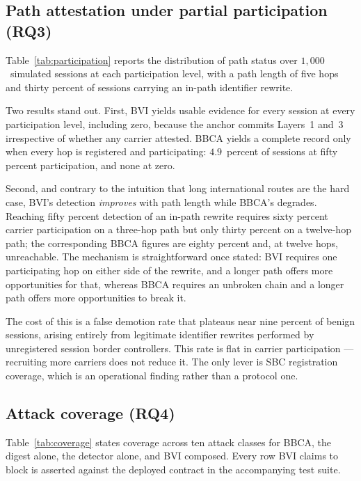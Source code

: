 \subsection{Path attestation under partial participation (RQ3)}

Table~\ref{tab:participation} reports the distribution of path status over
$1{,}000$~simulated sessions at each participation level, with a path length of
five hops and thirty percent of sessions carrying an in-path identifier
rewrite.

Two results stand out. First, BVI yields usable evidence for every session at
every participation level, including zero, because the anchor commits Layers~1
and~3 irrespective of whether any carrier attested. BBCA yields a complete
record only when every hop is registered and participating: $4.9$~percent of
sessions at fifty percent participation, and none at zero.

Second, and contrary to the intuition that long international routes are the
hard case, BVI's detection \emph{improves} with path length while BBCA's
degrades. Reaching fifty percent detection of an in-path rewrite requires sixty
percent carrier participation on a three-hop path but only thirty percent on a
twelve-hop path; the corresponding BBCA figures are eighty percent and, at
twelve hops, unreachable. The mechanism is straightforward once stated: BVI
requires one participating hop on either side of the rewrite, and a longer path
offers more opportunities for that, whereas BBCA requires an unbroken chain and
a longer path offers more opportunities to break it.

The cost of this is a false demotion rate that plateaus near nine percent of
benign sessions, arising entirely from legitimate identifier rewrites performed
by unregistered session border controllers. This rate is flat in carrier
participation --- recruiting more carriers does not reduce it. The only lever
is SBC registration coverage, which is an operational finding rather than a
protocol one.

\subsection{Attack coverage (RQ4)}

Table~\ref{tab:coverage} states coverage across ten attack classes for BBCA,
the digest alone, the detector alone, and BVI composed. Every row BVI claims to
block is asserted against the deployed contract in the accompanying test suite.

